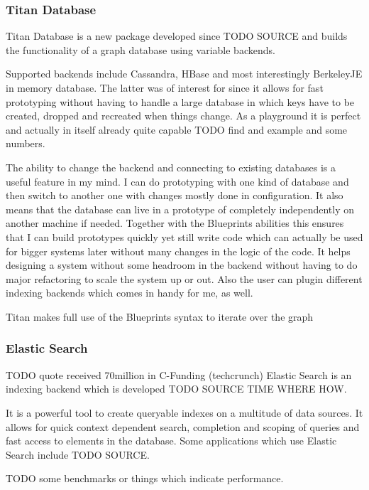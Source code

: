 \documentclass[11p]{scrartcl}
\begin{document}
\subsubsection{Titan Database}
Titan Database is a new package developed since TODO SOURCE and builds the functionality of a graph database using variable backends.

Supported backends include Cassandra, HBase and most interestingly BerkeleyJE in memory database. The latter was of interest for since it allows for fast prototyping without having to handle a large database in which keys have to be created, dropped and recreated when things change. As a playground it is perfect and actually in itself already quite capable TODO find and example and some numbers.

The ability to change the backend and connecting to existing databases is a useful feature in my mind. I can do prototyping with one kind of database and then switch to another one with changes mostly done in configuration. It also means that the database can live in a prototype of completely independently on another machine if needed. Together with the Blueprints abilities this ensures that I can build prototypes quickly yet still write code which can actually be used for bigger systems later without many changes in the logic of the code. It helps designing a system without some headroom in the backend without having to do major refactoring to scale the system up or out. Also the user can plugin different indexing backends which comes in handy for me, as well.

Titan makes full use of the Blueprints syntax to iterate over the graph 

\subsubsection{Elastic Search}
TODO quote received 70million in C-Funding (techcrunch)
Elastic Search is an indexing backend which is developed TODO SOURCE TIME WHERE HOW.

It is a powerful tool to create queryable indexes on a multitude of data sources. It allows for quick context dependent search, completion and scoping of queries and fast access to elements in the database.
Some applications which use Elastic Search include TODO SOURCE.

TODO some benchmarks or things which indicate performance.
	
\end{document}
